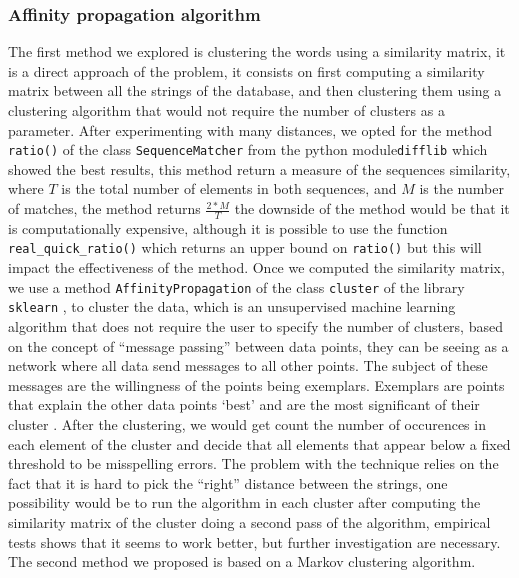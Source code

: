\documentclass{article}
\begin{document}
\subsubsection{Affinity propagation algorithm}
The first method we explored is clustering the words using a similarity matrix, it is a direct approach of the problem, it consists on first computing a similarity matrix between all the strings of the database, and then clustering them using a clustering algorithm that would not require the number of clusters as a parameter. After experimenting with many distances, we opted for the method \texttt{ratio()} of the class \texttt{SequenceMatcher} from the python module\texttt{difflib} which showed the best results, this method return a measure of the sequences similarity, where $T$ is the total number of elements in both sequences, and $M$ is the number of matches, the method returns $\frac{2*M}{T}$ the downside of the method would be that it is computationally expensive, although it is possible to use the function \texttt{real\_quick\_ratio()} which returns an upper bound on \texttt{ratio()}
but this will impact the effectiveness of the method. Once we computed the similarity matrix, we use a method \texttt{AffinityPropagation} of the class \texttt{cluster} of the library \texttt{sklearn} \cite{sklearn}, to cluster the data, which is an unsupervised machine learning algorithm that does not require the user to specify the number of clusters, based on the concept of ``message passing'' between data points, they can be seeing as a network where all data send messages to all other points. The subject of these messages are the willingness of the points being exemplars. Exemplars are points that explain the other data points ‘best’ and are the most significant of their cluster \cite{richi}. After the clustering, we would get count the number of occurences in each element of the cluster and decide that all elements that appear below a fixed threshold to be misspelling errors. The problem with the technique relies on the fact that it is hard to pick the ``right'' distance between the strings, one possibility would be to run the algorithm in each cluster after computing the similarity matrix of the cluster doing a second pass of the algorithm, empirical tests shows that it seems to work better, but further investigation are necessary.
The second method we proposed is based on a Markov clustering algorithm.
\end{document}
